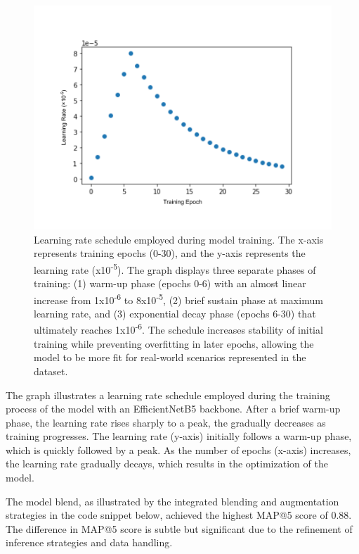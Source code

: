 \documentclass[twocolumn]{article}
\begin{document}
\begin{figure}[H]
    \centering
    \includegraphics[width=1\linewidth]{learning.png}
    \caption{Learning rate schedule employed during model training. The x-axis represents training epochs (0-30), and the y-axis represents the learning rate (x10\textsuperscript{-5}). The graph displays three separate phases of training: (1) warm-up phase (epochs 0-6) with an almost linear increase from 1x10\textsuperscript{-6} to 8x10\textsuperscript{-5}, (2) brief sustain phase at maximum learning rate, and (3) exponential decay phase (epochs 6-30) that ultimately reaches 1x10\textsuperscript{-6}. The schedule increases stability of initial training while preventing overfitting in later epochs, allowing the model to be more fit for real-world scenarios represented in the dataset.}
\end{figure}

The graph illustrates a learning rate schedule employed during the training process of the model with an EfficientNetB5 backbone. After a brief warm-up phase, the learning rate rises sharply to a peak, the gradually decreases as training progresses. The learning rate (y-axis) initially follows a warm-up phase, which is quickly followed by a peak. As the number of epochs (x-axis) increases, the learning rate gradually decays, which results in the optimization of the model. 

The model blend, as illustrated by the integrated blending and augmentation strategies in the code snippet below, achieved the highest MAP@5 score of 0.88. The difference in MAP@5 score is subtle but significant due to the refinement of inference strategies and data handling.
\end{document}
